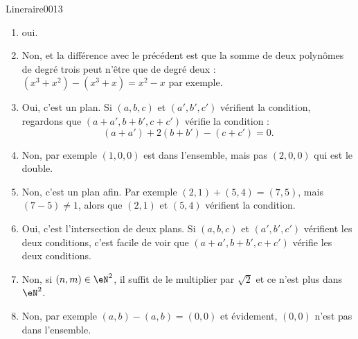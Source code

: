 \begin{corrige}{Lineraire0013}

	\begin{enumerate}

		\item
			oui.
		\item
			Non, et la différence avec le précédent est que la somme de deux polynômes de degré trois peut n'être que de degré deux : $(x^3+x^2)-(x^3+x)=x^2-x$ par exemple.

		\item
			Oui, c'est un plan. Si $(a,b,c)$ et $(a',b',c')$ vérifient la condition, regardons que $(a+a',b+b',c+c')$ vérifie la condition :
			\begin{equation}
				(a+a')+2(b+b')-(c+c')=0.
			\end{equation}
			
		\item
			Non, par exemple $(1,0,0)$ est dans l'ensemble, mais pas $(2,0,0)$ qui est le double.

		\item 
			Non, c'est un plan afin. Par exemple $(2,1)+(5,4)=(7,5)$, mais $(7-5)\neq 1$, alors que $(2,1)$ et $(5,4)$ vérifient la condition.

		\item
			Oui, c'est l'intersection de deux plans. Si $(a,b,c)$ et $(a',b',c')$ vérifient les deux conditions, c'est facile de voir que $(a+a',b+b',c+c')$ vérifie les deux conditions.

		\item
			Non, si $(n,m)\in\eN^2$, il suffit de le multiplier par $\sqrt{2}$ et ce n'est plus dans $\eN^2$.

		\item
			Non, par exemple $(a,b)-(a,b)=(0,0)$ et évidement, $(0,0)$ n'est pas dans l'ensemble.

	\end{enumerate}
	

\end{corrige}
